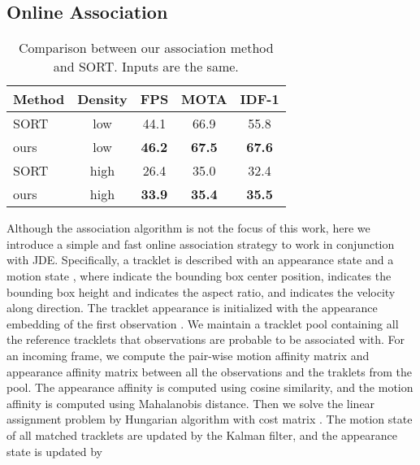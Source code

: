 \documentclass[runningheads]{llncs}
\begin{document}
\subsection{Online Association}
\label{sec:association}

\begin{wraptable}{r}{0.6\linewidth}


    
\centering
    \begin{tabular}{l | c | c  c  c }
    \toprule
    Method & Density & FPS & MOTA & IDF-1 \\
    \hline
    SORT~\cite{sort} & low & 44.1 & 66.9 & 55.8\\
    ours & low & \textbf{46.2} & \textbf{67.5} & \textbf{67.6}\\
    
    \hline
    SORT~\cite{sort} & high & 26.4 & 35.0 & 32.4\\
    ours & high & \textbf{33.9} & \textbf{35.4} & \textbf{35.5}\\
    \bottomrule
    
    \end{tabular}
    \caption{Comparison between our association method and SORT. Inputs are the same. }
    \label{tab:sort}
    
\end{wraptable}

Although the association algorithm is not the focus of this work, here we introduce a simple and fast online association strategy to work in conjunction with JDE. Specifically, a tracklet is described with an appearance state  and a motion state , where  indicate the bounding box center position,  indicates the bounding box height and  indicates the aspect ratio, and  indicates the velocity along  direction. The tracklet appearance  is initialized with the appearance embedding of the first observation . We maintain a tracklet pool containing all the reference tracklets that observations are probable to be associated with. For an incoming frame, we compute the pair-wise motion affinity matrix  and appearance affinity matrix  between all the observations and the traklets from the pool. The appearance affinity is computed using cosine similarity, and the motion affinity is computed using Mahalanobis distance. Then we solve the linear assignment problem by Hungarian algorithm with cost matrix . The motion state  of all matched tracklets are  updated by the Kalman filter, and the appearance state  is updated by
\end{document}
